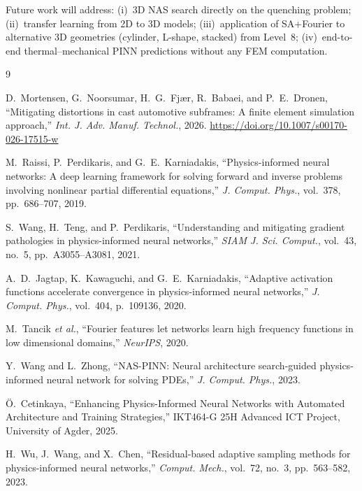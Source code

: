 \documentclass[10pt, twocolumn]{article}
\begin{document}
Future work will address: (i)~3D NAS search directly on the quenching problem; (ii)~transfer
learning from 2D to 3D models; (iii)~application of SA+Fourier to alternative 3D geometries
(cylinder, L-shape, stacked) from Level~8; (iv)~end-to-end thermal--mechanical PINN
predictions without any FEM computation.

\balance
\begin{thebibliography}{9}

D.~Mortensen, G.~Noorsumar, H.~G.~Fjær, R.~Babaei, and P.~E.~Dronen,
``Mitigating distortions in cast automotive subframes: A finite element simulation approach,''
\textit{Int. J. Adv. Manuf. Technol.}, 2026.
\url{https://doi.org/10.1007/s00170-026-17515-w}

M.~Raissi, P.~Perdikaris, and G.~E.~Karniadakis,
``Physics-informed neural networks: A deep learning framework for solving forward and inverse
problems involving nonlinear partial differential equations,''
\textit{J. Comput. Phys.}, vol.~378, pp.~686--707, 2019.

S.~Wang, H.~Teng, and P.~Perdikaris,
``Understanding and mitigating gradient pathologies in physics-informed neural networks,''
\textit{SIAM J. Sci. Comput.}, vol.~43, no.~5, pp.~A3055--A3081, 2021.

A.~D.~Jagtap, K.~Kawaguchi, and G.~E.~Karniadakis,
``Adaptive activation functions accelerate convergence in physics-informed neural networks,''
\textit{J. Comput. Phys.}, vol.~404, p.~109136, 2020.

M.~Tancik \textit{et al.},
``Fourier features let networks learn high frequency functions in low dimensional domains,''
\textit{NeurIPS}, 2020.

Y.~Wang and L.~Zhong,
``NAS-PINN: Neural architecture search-guided physics-informed neural network for solving PDEs,''
\textit{J. Comput. Phys.}, 2023.

Ö.~Cetinkaya,
``Enhancing Physics-Informed Neural Networks with Automated Architecture and Training Strategies,''
IKT464-G 25H Advanced ICT Project, University of Agder, 2025.

H.~Wu, J.~Wang, and X.~Chen,
``Residual-based adaptive sampling methods for physics-informed neural networks,''
\textit{Comput. Mech.}, vol.~72, no.~3, pp.~563--582, 2023.

\end{thebibliography}
\end{document}
